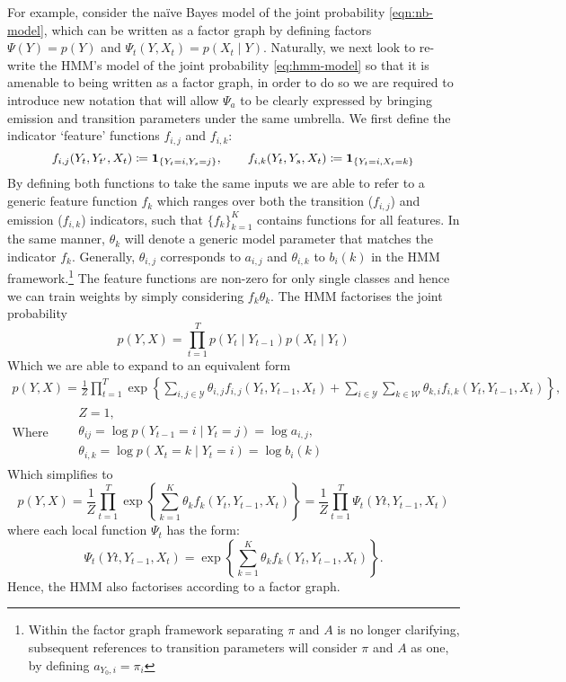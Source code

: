 \documentclass[../main.tex]{subfiles}
\begin{document}
For example, consider the na{\"i}ve Bayes model of the joint probability \cref{eqn:nb-model}, which can be written as a factor graph by defining factors $\Psi(Y) = p(Y)$ and $\Psi_t(Y,X_t) = p(X_t \mid Y)$.
Naturally, we next look to re-write the HMM's model of the joint probability \cref{eq:hmm-model} so that it is amenable to being written as a factor graph, in order to do so we are required to introduce new notation that will allow $\Psi_a$ to be clearly expressed by bringing emission and transition parameters under the same umbrella. %
We first define the indicator `feature' functions $f_{i,j}$ and $f_{i,k}$:
\begin{equation*}
    f_{i,j}(Y_t, Y_{t'}, X_t) \coloneqq \mathbf{1}_{\{Y_t=i,Y_s=j\}}, \qquad f_{i,k}(Y_t, Y_s, X_t) \coloneqq \mathbf{1}_{\{Y_t=i,X_t=k\}}
\end{equation*}
By defining both functions to take the same inputs we are able to refer to a generic feature function $f_k$ which ranges over both the transition ($f_{i,j}$) and emission ($f_{i,k}$) indicators, such that $\{ f_k \}_{k=1}^K$ contains functions for all features.
In the same manner, $\theta_k$ will denote a generic model parameter that matches the indicator $f_k$. Generally, $\theta_{i,j}$ corresponds to $a_{i,j}$ and $\theta_{i,k}$ to $b_i(k)$ in the HMM framework.\footnote{Within the factor graph framework separating $\pi$ and $A$ is no longer clarifying, subsequent references to transition parameters will consider $\pi$ and $A$ as one, by defining $a_{Y_0,i} = \pi_i$}
The feature functions are non-zero for only single classes and hence we can train weights by simply considering $f_k \theta_k$.
The HMM factorises the joint probability
\begin{equation} \label{eq:hmm-model} 
    p(Y,X) = \prod_{t=1}^T p(Y_t \mid Y_{t-1})p(X_t \mid Y_t)
\end{equation}
Which we are able to expand to an equivalent form
\begin{gather*}
    p(Y,X) = \frac{1}{Z} \prod_{t=1}^T \exp \left\{ \sum_{i,j \in \mathcal{Y}} \theta_{i,j} f_{i,j}(Y_t, Y_{t-1}, X_t) + \sum_{i \in \mathcal{Y}} \sum_{k \in \mathcal{W}} \theta_{k,i} f_{i,k}(Y_t, Y_{t-1}, X_t) \right\}, \\
    \text{Where} \qquad \begin{array}{lr}
    Z=1, \\ \theta_{ij} = \log{p(Y_{t-1}=i \mid Y_t=j)} = \log{a_{i,j}}, \\ \theta_{i,k} = \log{p(X_t=k \mid Y_t=i)} = \log{b_i(k)}
    \end{array}
\end{gather*}
Which simplifies to
\begin{equation*}
    p(Y,X) = \frac{1}{Z} \prod_{t=1}^T \exp \left\{ \sum_{k=1}^K \theta_k f_k(Y_t, Y_{t-1}, X_t) \right\} = \frac{1}{Z} \prod_{t=1}^T \Psi_t(Yt,Y_{t-1},X_t)
\end{equation*}
where each local function $\Psi_t$ has the form:
\begin{equation*}
    \Psi_t(Yt,Y_{t-1},X_t) = \exp \left\{ \sum_{k=1}^K \theta_k f_k(Y_t, Y_{t-1}, X_t) \right\}.
\end{equation*}
Hence, the HMM also factorises according to a factor graph.
\end{document}
